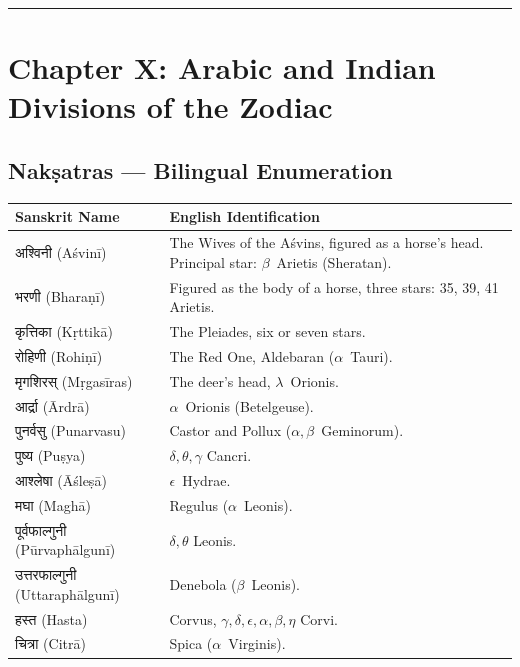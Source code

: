 \documentclass[11pt,a4paper]{article}
\newcommand{\longline}{\noindent\rule{\textwidth}{0.4pt}}
\newcommand{\dev}[1]{{\devanagarifont #1}}
\theoremstyle{definition}
\begin{document}
\longline

\section{Chapter X: Arabic and Indian Divisions of the Zodiac}
\label{sec:zodiac}

\subsection*{Nak\d{s}atras --- Bilingual Enumeration}

\begin{longtable}{p{}p{}}
\toprule
\textbf{Sanskrit Name} & \textbf{English Identification} \\
\midrule
\endhead
\dev{अश्विनी} (A\'{s}vin\={i}) & The Wives of the A\'{s}vins, figured as a horse's head. Principal star: $\beta$~Arietis (Sheratan). \\
\dev{भरणी} (Bhara\d{n}\={i}) & Figured as the body of a horse, three stars: 35, 39, 41 Arietis. \\
\dev{कृत्तिका} (K\d{r}ttik\={a}) & The Pleiades, six or seven stars. \\
\dev{रोहिणी} (Rohi\d{n}\={i}) & The Red One, Aldebaran ($\alpha$~Tauri). \\
\dev{मृगशिरस्} (M\d{r}gas\={i}ras) & The deer's head, $\lambda$~Orionis. \\
\dev{आर्द्रा} (\=Ardr\={a}) & $\alpha$~Orionis (Betelgeuse). \\
\dev{पुनर्वसु} (Punarvasu) & Castor and Pollux ($\alpha, \beta$~Geminorum). \\
\dev{पुष्य} (Pu\d{s}ya) & $\delta, \theta, \gamma$ Cancri. \\
\dev{आश्लेषा} (\=A\'{s}le\d{s}\={a}) & $\epsilon$~Hydrae. \\
\dev{मघा} (Magh\={a}) & Regulus ($\alpha$~Leonis). \\
\dev{पूर्वफाल्गुनी} (P\={u}rvaph\=algun\={i}) & $\delta, \theta$ Leonis. \\
\dev{उत्तरफाल्गुनी} (Uttaraph\=algun\={i}) & Denebola ($\beta$~Leonis). \\
\dev{हस्त} (Hasta) & Corvus, $\gamma, \delta, \epsilon, \alpha, \beta, \eta$ Corvi. \\
\dev{चित्रा} (Citr\={a}) & Spica ($\alpha$~Virginis). \\

\end{longtable}
\end{document}
